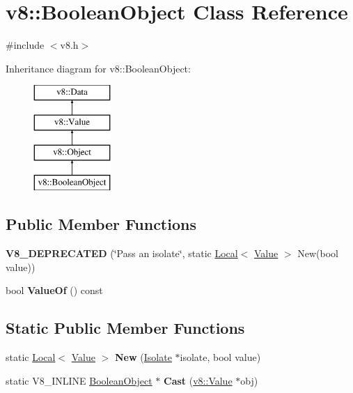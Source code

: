 \hypertarget{classv8_1_1_boolean_object}{}\section{v8\+:\+:Boolean\+Object Class Reference}
\label{classv8_1_1_boolean_object}


{\ttfamily \#include $<$v8.\+h$>$}

Inheritance diagram for v8\+:\+:Boolean\+Object\+:\begin{figure}[H]
\begin{center}
\leavevmode
\includegraphics[height=4.000000cm]{classv8_1_1_boolean_object}
\end{center}
\end{figure}
\subsection*{Public Member Functions}
\begin{DoxyCompactItemize}
\item 
{\bfseries V8\+\_\+\+D\+E\+P\+R\+E\+C\+A\+T\+ED} (\char`\"{}Pass an isolate\char`\"{}, static \hyperlink{classv8_1_1_local}{Local}$<$ \hyperlink{classv8_1_1_value}{Value} $>$ New(bool value))\hypertarget{classv8_1_1_boolean_object_ae13a7178a7ee05969b97fa5b0d22cd52}{}\label{classv8_1_1_boolean_object_ae13a7178a7ee05969b97fa5b0d22cd52}

\item 
bool {\bfseries Value\+Of} () const \hypertarget{classv8_1_1_boolean_object_a283419656e641bcd9588dee56c0a0686}{}\label{classv8_1_1_boolean_object_a283419656e641bcd9588dee56c0a0686}

\end{DoxyCompactItemize}
\subsection*{Static Public Member Functions}
\begin{DoxyCompactItemize}
\item 
static \hyperlink{classv8_1_1_local}{Local}$<$ \hyperlink{classv8_1_1_value}{Value} $>$ {\bfseries New} (\hyperlink{classv8_1_1_isolate}{Isolate} $\ast$isolate, bool value)\hypertarget{classv8_1_1_boolean_object_a2cdd408e1318a28cdffe48185f225ec6}{}\label{classv8_1_1_boolean_object_a2cdd408e1318a28cdffe48185f225ec6}

\item 
static V8\+\_\+\+I\+N\+L\+I\+NE \hyperlink{classv8_1_1_boolean_object}{Boolean\+Object} $\ast$ {\bfseries Cast} (\hyperlink{classv8_1_1_value}{v8\+::\+Value} $\ast$obj)\hypertarget{classv8_1_1_boolean_object_ac701398c9b1c74fbce31d66106c9a87f}{}\label{classv8_1_1_boolean_object_ac701398c9b1c74fbce31d66106c9a87f}

\end{DoxyCompactItemize}
